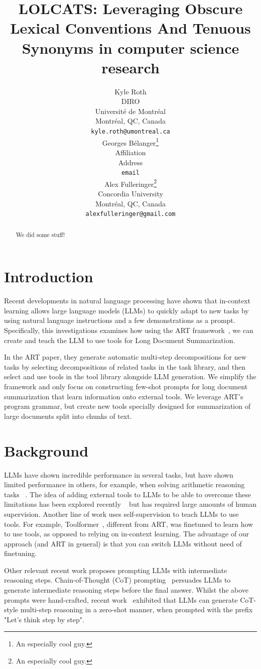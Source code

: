 \documentclass{article}
\title{LOLCATS: Leveraging Obscure Lexical Conventions And Tenuous Synonyms in computer science research}
\author{%
  Kyle Roth \\
  DIRO \\
  Université de Montréal \\
  Montréal, QC, Canada \\
  \texttt{kyle.roth@umontreal.ca} \\
  \And
  Georges Bélanger\thanks{An especially cool guy.} \\
  Affiliation \\
  Address \\
  \texttt{email} \\
  \And
  Alex Fulleringer\thanks{An especially cool guy.} \\
  Concordia University \\
  Montréal, QC, Canada \\
  \texttt{alexfulleringer@gmail.com} \\
}
\begin{document}
\maketitle


\begin{abstract}
  We did some stuff!
\end{abstract}


\section{Introduction}
Recent developments in natural language processing have shown that in-context learning allows large language models (LLMs) to quickly adapt to new tasks by using natural language instructions and a few demonstrations as a prompt.
Specifically, this investigations examines how using the ART framework~\cite{paranjape2023art}, we can create and teach the LLM to use tools for Long Document Summarization.

In the ART paper, they generate automatic multi-step decompositions for new tasks by selecting decompositions of related tasks in the task library, and then select and use tools in the tool library alongside LLM generation.
We simplify the framework and only focus on constructing few-shot prompts for long document summarization that learn information onto external tools. We leverage ART's program grammar, but create new tools specially designed for summarization of large documents split into chunks of text.


\section{Background}
LLMs have shown incredible performance in several tasks, but have shown limited performance in others, for example, when solving arithmetic reasoning tasks ~\cite{imani2023mathprompter}.
The idea of adding external tools to LLMs to be able to overcome these limitations has been explored recently ~\cite{shuster2022language} but has required large amounts of human supervision.
Another line of work uses self-supervision to teach LLMs to use tools. For example, Toolformer~\cite{schick2023toolformer}, different from ART, was finetuned to learn how to use tools, as opposed to relying on in-context learning. 
The advantage of our approach (and ART in general) is that you can switch LLMs without need of finetuning.

Other relevant recent work proposes prompting LLMs with intermediate reasoning steps. Chain-of-Thought (CoT) prompting~\cite{wei2023chainofthought} persuades LLMs to generate intermediate reasoning steps before the final answer.
Whilst the above prompts were hand-crafted, recent work~\cite{kojima2023large} exhibited that LLMs can generate CoT-style multi-step reasoning in a zero-shot manner, when prompted with the prefix "Let's think step by step".
\end{document}
